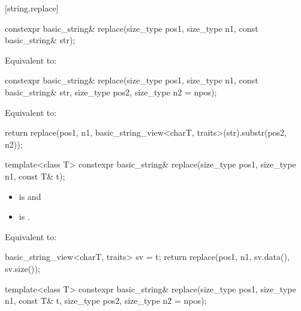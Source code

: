 [string.replace]{}

%
\begin{itemdecl}
constexpr basic_string& replace(size_type pos1, size_type n1, const basic_string& str);
\end{itemdecl}

\begin{itemdescr}
\pnum
\effects
Equivalent to: 
\end{itemdescr}

%
\begin{itemdecl}
constexpr basic_string& replace(size_type pos1, size_type n1, const basic_string& str,
                                size_type pos2, size_type n2 = npos);
\end{itemdecl}

\begin{itemdescr}
\pnum
\effects
Equivalent to:
\begin{codeblock}
return replace(pos1, n1, basic_string_view<charT, traits>(str).substr(pos2, n2));
\end{codeblock}
\end{itemdescr}

%
\begin{itemdecl}
template<class T>
  constexpr basic_string& replace(size_type pos1, size_type n1, const T& t);
\end{itemdecl}

\begin{itemdescr}
\pnum
\constraints
\begin{itemize}
\item
{} is
 and
\item
{} is
.
\end{itemize}

\pnum
\effects
Equivalent to:
\begin{codeblock}
basic_string_view<charT, traits> sv = t;
return replace(pos1, n1, sv.data(), sv.size());
\end{codeblock}
\end{itemdescr}

%
\begin{itemdecl}
template<class T>
  constexpr basic_string& replace(size_type pos1, size_type n1, const T& t,
                                  size_type pos2, size_type n2 = npos);
\end{itemdecl}

